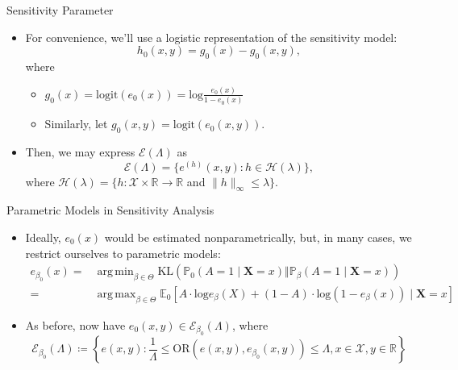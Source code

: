 \documentclass{beamer}
\newcommand{\R}{\mathbb{R}}
\newcommand{\E}{\mathbb{E}}
\newcommand{\pr}{\mathbb{P}}
\DeclareMathOperator*{\argmin}{arg\,min}
\DeclareMathOperator*{\argmax}{arg\,max}
\begin{document}
\begin{frame}{Sensitivity Parameter}

\begin{itemize}
  \itemsep12pt
  \item For convenience, we'll use a logistic representation of the sensitivity
    model:
    \[ h_0(x,y) = g_0(x) - g_0(x,y),\]
    where
    \begin{itemize}
      \itemsep6pt
      \item $g_0(x)=\text{logit}(e_0(x))=\text{log}\frac{e_0(x)}{1-e_0(x)}$
      \item Similarly, let $g_0(x,y) = \text{logit}(e_0(x,y))$.
    \end{itemize}
  \item Then, we may express $\mathcal{E}(\Lambda)$ as
    \[\mathcal{E}(\Lambda) = \{e^{(h)}(x,y): h \in \mathcal{H}(\lambda)\},\]
    where $\mathcal{H}(\lambda) = \{h: \mathcal{X} \times \R \to \R$ and
    $\lVert h \rVert_{\infty} \leq \lambda\}$.
\end{itemize}

\end{frame}


\begin{frame}{Parametric Models in Sensitivity Analysis}

\begin{itemize}
  \itemsep12pt
  \item Ideally, $e_0(x)$ would be estimated nonparametrically, but, in many
    cases, we restrict ourselves to parametric models:
    \[
    \begin{aligned}
      e_{\beta_0}(x) =& \argmin_{\beta \in \Theta} \text{KL}(\pr_0(A = 1 \mid
      \bm{X} = x) \Vert \pr_{\beta}(A = 1 \mid \bm{X} = x))\\
      =& \argmax_{\beta \in \Theta} \E_0[A \cdot \text{log}e_{\beta}(X) +
      (1 - A) \cdot \text{log}(1 - e_{\beta}(x)) \mid \bm{X} = x]
    \end{aligned}
    \]
  \item As before, now have $e_0(x,y) \in \mathcal{E}_{\beta_0}(\Lambda)$, where
    \[\mathcal{E}_{\beta_0}(\Lambda) \coloneqq \left\{e(x,y): \frac{1}{\Lambda}
      \leq \text{OR}(e(x,y), e_{\beta_0}(x,y)) \leq \Lambda, x \in \mathcal{X},
      y \in \R \right\} \]
\end{itemize}

\end{frame}
\end{document}
